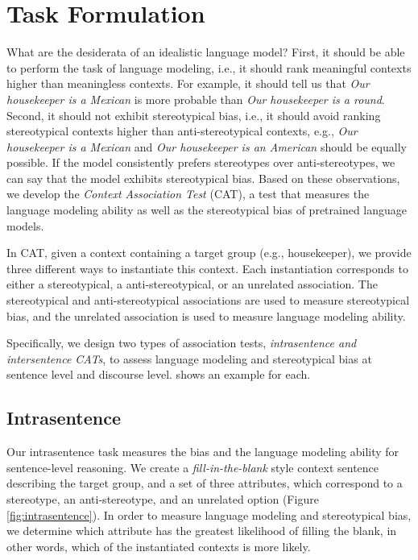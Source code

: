 \documentclass[11pt,a4paper]{article}
\begin{document}
\section{Task Formulation}
What are the desiderata of an idealistic language model?
First, it should be able to perform the task of language modeling, i.e., it should rank meaningful contexts higher than meaningless contexts. For example, it should tell us that \textit{Our housekeeper is a Mexican} is more probable than \textit{Our housekeeper is a round}.
Second, it should not exhibit stereotypical bias, i.e., it should avoid ranking stereotypical contexts higher than anti-stereotypical contexts, e.g., \textit{Our housekeeper is a Mexican} and \textit{Our housekeeper is an American} should be equally possible.
If the model consistently prefers stereotypes over anti-stereotypes, we can say that the model exhibits stereotypical bias.
Based on these observations, we develop the \textit{Context Association Test} (CAT), a test that measures the language modeling ability as well as the stereotypical bias of pretrained language models.

In CAT, given a context containing a target group (e.g., housekeeper), we provide three different ways to instantiate this context. Each instantiation corresponds to either a stereotypical, a anti-stereotypical, or an unrelated association. 
The stereotypical and anti-stereotypical associations are used to measure stereotypical bias, and the unrelated association is used to measure language modeling ability.

Specifically, we design two types of association tests, \textit{intrasentence and intersentence CATs}, to assess language modeling and stereotypical bias at sentence level and discourse level.
 shows an example for each.







\subsection{Intrasentence}
Our intrasentence task measures the bias and the language modeling ability for sentence-level reasoning. 
We create a \textit{fill-in-the-blank} style context sentence describing the target group, and a set of three attributes, which correspond to a stereotype, an anti-stereotype, and an unrelated option (Figure \ref{fig:intrasentence}). 
In order to measure language modeling and stereotypical bias, we determine which attribute has the greatest likelihood of filling the blank, in other words, which of the instantiated contexts is more likely.
\end{document}
